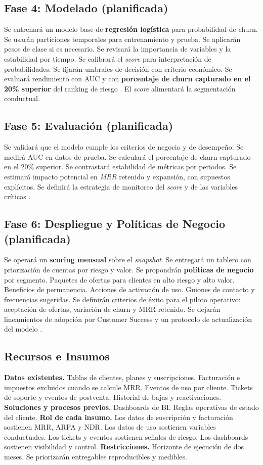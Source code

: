 \subsection{Fase 4: Modelado (planificada)}
Se entrenará un modelo base de \textbf{regresión logística} para probabilidad de churn. Se usarán particiones temporales para entrenamiento y prueba. Se aplicarán pesos de clase si es necesario. Se revisará la importancia de variables y la estabilidad por tiempo. Se calibrará el \textit{score} para interpretación de probabilidades. Se fijarán umbrales de decisión con criterio económico. Se evaluará rendimiento con AUC y con \textbf{porcentaje de churn capturado en el 20\% superior} del ranking de riesgo \citep{Chapman2000}. El \textit{score} alimentará la segmentación conductual.

\subsection{Fase 5: Evaluación (planificada)}
Se validará que el modelo cumple los criterios de negocio y de desempeño. Se medirá AUC en datos de prueba. Se calculará el porcentaje de churn capturado en el 20\% superior. Se contrastará estabilidad de métricas por periodos. Se estimará impacto potencial en \textit{MRR} retenido y expansión, con supuestos explícitos. Se definirá la estrategia de monitoreo del \textit{score} y de las variables críticas \citep{Chapman2000,Kumar2018}.

\subsection{Fase 6: Despliegue y Políticas de Negocio (planificada)}
Se operará un \textbf{scoring mensual} sobre el \textit{snapshot}. Se entregará un tablero con priorización de cuentas por riesgo y valor. Se propondrán \textbf{políticas de negocio} por segmento. Paquetes de ofertas para clientes en alto riesgo y alto valor. Beneficios de permanencia. Acciones de activación de uso. Guiones de contacto y frecuencias sugeridas. Se definirán criterios de éxito para el piloto operativo: aceptación de ofertas, variación de churn y MRR retenido. Se dejarán lineamientos de adopción por Customer Success y un protocolo de actualización del modelo \citep{Chapman2000}.

\subsection{Recursos e Insumos}
\textbf{Datos existentes.} Tablas de clientes, planes y suscripciones. Facturación e impuestos excluidos cuando se calcule MRR. Eventos de uso por cliente. Tickets de soporte y eventos de postventa. Historial de bajas y reactivaciones. \textbf{Soluciones y procesos previos.} Dashboards de BI. Reglas operativas de estado del cliente. \textbf{Rol de cada insumo.} Los datos de suscripción y facturación sostienen MRR, ARPA y NDR. Los datos de uso sostienen variables conductuales. Los tickets y eventos sostienen señales de riesgo. Los dashboards sostienen visibilidad y control. \textbf{Restricciones.} Horizonte de ejecución de dos meses. Se priorizarán entregables reproducibles y medibles.

